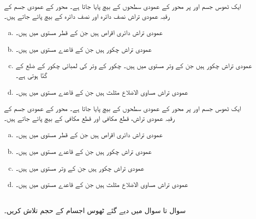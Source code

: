 ایک ٹھوس جسم   اور  پر  محور  کے عمودی سطحوں کے بیچ پایا جاتا ہے۔   محور کے عمودی جسم  کے رقبہ عمودی تراش نصف دائرہ  اور نصف دائرہ  کے بیچ پائے جاتے ہیں۔ 
\begin{enumerate}[a.]
\item
عمودی تراش دائری اقراص ہیں جن کے قطر  مستوی میں ہیں۔
\item
عمودی تراش چکور ہیں جن کے قاعدے  مستوی میں ہیں۔
\item
عمودی تراش چکور ہیں جن کے وتر  مستوی میں ہیں۔ چکور کے وتر کی لمبائی چکور کے ضلع کے  گنّا ہوتی ہے۔
\item
عمودی تراش مساوی الاضلاع مثلث ہیں جن کے قاعدے  مستوی میں ہیں۔
\end{enumerate}
ایک ٹھوس جسم   اور  پر   محور  کے عمودی  سطحوں کے بیچ پایا جاتا ہے۔  محور کے عمودی جسم  کے رقبہ عمودی تراش، قطع مکافی   اور قطع مکافی  کے بیچ پائے جاتے ہیں۔ 
\begin{enumerate}[a.]
\item
عمودی تراش دائری اقراص ہیں جن کے قطر  مستوی میں ہیں۔
\item
عمودی تراش چکور ہیں جن کے قاعدے  مستوی میں ہیں۔
\item
عمودی تراش چکور ہیں جن کے وتر  مستوی میں ہیں۔
\item
عمودی تراش مساوی الاضلاع مثلث ہیں جن کے قاعدے  مستوی میں ہیں۔
\end{enumerate}

\\
سوال  تا سوال  میں دیے گئے ٹھوس اجسام کے حجم تلاش کریں۔

